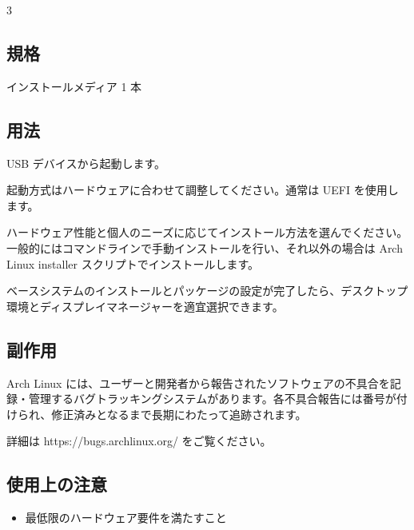 \documentclass{article}
\begin{document}
\begin{multicols*}{3}
	\begin{tcolorbox}
	\section*{規格}
	\end{tcolorbox}

	インストールメディア 1 本

	\medskip

	\begin{tcolorbox}
	\section*{用法}
	\end{tcolorbox}

	USB デバイスから起動します。

	起動方式はハードウェアに合わせて調整してください。通常は UEFI を使用します。

	ハードウェア性能と個人のニーズに応じてインストール方法を選んでください。一般的にはコマンドラインで手動インストールを行い、それ以外の場合は Arch Linux installer スクリプトでインストールします。

	ベースシステムのインストールとパッケージの設定が完了したら、デスクトップ環境とディスプレイマネージャーを適宜選択できます。

	\medskip

	\begin{tcolorbox}
	\section*{副作用}
	\end{tcolorbox}

	Arch Linux には、ユーザーと開発者から報告されたソフトウェアの不具合を記録・管理するバグトラッキングシステムがあります。各不具合報告には番号が付けられ、修正済みとなるまで長期にわたって追跡されます。

	詳細は https://bugs.archlinux.org/ をご覧ください。

	\medskip


	\begin{tcolorbox}
	\section*{使用上の注意}
	\end{tcolorbox}
	\begin{itemize}[leftmargin=*]

		\item 最低限のハードウェア要件を満たすこと


\end{itemize}
\end{multicols*}
\end{document}
